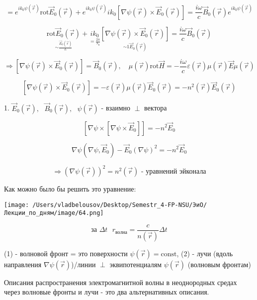 \documentclass[12pt, a4paper]{report}
\begin{document}
\[ = e^{i k_0 \psi (\vec{r } )} \mathrm{rot } \vec{E } _0 (\vec{r } ) + e^{i k_0 \psi (\vec{r } )} i k_0 \left[ \nabla \psi (\vec{r } ) \times  \vec{E } _0 (\vec{r } ) \right] = \frac{i \omega }{c } \vec{B } _0 (\vec{r } ) e^{i k_0 \psi (\vec{r } )}    \] 

\[ \underset{\sim \frac{\vec{E } _0 (\vec{r } )}{L} }{\mathrm{rot } \vec{E } _0 (\vec{r} )} + \underset{= \frac{2\pi}{\lambda_0} }{i k_0 }\underset{\sim 1  \vec{E } _0 (\vec{r} )}{\left[ \nabla \psi (\vec{r } ) \times \vec{E } _0 (\vec{r} ) \right] } = \frac{ i \omega }{c }\vec{B } _ 0  (\vec{r } ) \] 

\[ \Rightarrow \left[ \nabla \psi (\vec{r } ) \times  \vec{E } _0 (\vec{r } ) \right] = \vec{B } _0 (\vec{r } ) ,\quad \mu(\vec{r } ) \mathrm{rot } \vec{H }  = - \frac{ i \omega }{c } \varepsilon (\vec{r } ) \mu (\vec{r } ) \vec{E }  \mu ( \vec{r } )  \] 

\[ \left[ \nabla \psi (\vec{r } ) \times \vec{E } _ 0 (\vec{r } )\right] = -  \varepsilon (\vec{r } ) \mu (\vec{r } ) \vec{E } _ 0 (\vec{r } ) = - n ^2 (\vec{r } ) \vec{E } _ 0 (\vec{r } ) \] 

1. \( \vec{E } _0 (\vec{r } ), \text{ } \vec{B } _0 (\vec{r } ) , \text{ }  \psi (\vec{r } ) \)  - взаимно \( \perp  \) вектора

\[ \left[ \nabla \psi \times \left[ \nabla \psi \times  \vec{E } _0 \right] \right] = - n ^2 \vec{E } _0 \] 

\[ \nabla \psi (\nabla \psi ,\vec{E } _0)- \vec{E } _0 (\nabla \psi ) ^2 = - n ^2 \vec{E } _0 \] 

\[ \Rightarrow (\nabla \psi (\vec{r } )) ^2  = n ^2 (\vec{r } ) \text{ - уравнений эйконала} \] 

Как можно было бы решить это уравнение: 

\begin{center}
    \texttt{[image: /Users/vladbelousov/Desktop/Semestr\_4-FP-NSU/ЭиО/Лекции\_по\_дням/image/64.png]}
\end{center}

\[ \text{за } \Delta t \text{ }  r_{\text{волна} } = \frac{c}{n(\vec{r } )} \Delta t    \] 

(1) - волновой фронт = это поверхности \( \psi (\vec{r } ) = \mathrm{const}   \), (2) - лучи (вдоль направления \( \nabla \psi (\vec{r} ) \))/линии \( \perp  \) эквипотенциалям \( \psi (\vec{r} ) \) (волновым фронтам)

Описания распространения электромагнитной волны в неоднородных средах через волновые фронты и лучи - это два альтернативных описания. 
\end{document}
